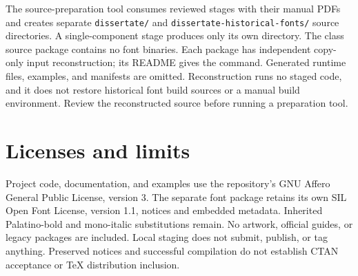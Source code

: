 \documentclass[10pt,letterpaper]{article}
\begin{document}
The source-preparation tool consumes reviewed stages with their manual PDFs and
creates separate \texttt{dissertate/} and \texttt{dissertate-historical-fonts/}
source directories. A single-component stage produces only its own directory.
The class source package contains no font binaries. Each package has independent
copy-only input reconstruction; its README gives the command. Generated runtime
files, examples, and manifests are omitted. Reconstruction runs no staged code,
and it does not restore historical font build sources or a manual build
environment. Review the reconstructed source before running a preparation tool.
\section*{Licenses and limits}
Project code, documentation, and examples use the repository's GNU Affero General
Public License, version 3. The separate font package retains its own SIL Open Font
License, version 1.1, notices and embedded metadata. Inherited Palatino-bold and
mono-italic substitutions remain. No artwork, official guides, or legacy packages
are included. Local staging does not submit, publish, or tag anything. Preserved
notices and successful compilation do not establish CTAN acceptance or TeX
distribution inclusion.
\end{document}
